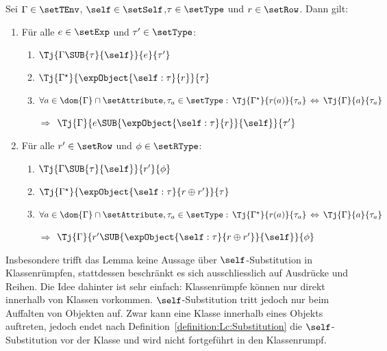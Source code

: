 \begin{lemma} \label{lemma:Lct:Typurteile_und_self_Substitution}
  Sei $\Gamma \in \setTEnv$, $\self\in\setSelf$,\linebreak[4] $\tau\in\setType$ und $r\in\setRow$. Dann gilt:
  \renewcommand{\labelenumii}{(\arabic{enumii})}
  \begin{enumerate}
    \item F\"ur alle $e\in\setExp$ und $\tau'\in\setType$:
          \begin{enumerate}
            \item $\Tj{\Gamma\SUB{\tau}{\self}}{e}{\tau'}$
            \item $\Tj{\Gamma^\star}{\expObject{\self:\tau}{r}}{\tau}$
            \item $\forall a\in\dom{\Gamma}\cap\setAttribute,\tau_a\in\setType:\,
                   \Tj{\Gamma^\star}{r(a)}{\tau_a}\,\Leftrightarrow\,\Tj{\Gamma}{a}{\tau_a}$
            \item[$\Rightarrow$] $\Tj{\Gamma}{e\SUB{\expObject{\self:\tau}{r}}{\self}}{\tau'}$
          \end{enumerate}

    \item F\"ur alle $r'\in\setRow$ und $\phi\in\setRType$:
          \begin{enumerate}
            \item $\Tj{\Gamma\SUB{\tau}{\self}}{r'}{\phi}$
            \item $\Tj{\Gamma^\star}{\expObject{\self:\tau}{r \oplus r'}}{\tau}$
            \item $\forall a\in\dom{\Gamma}\cap\setAttribute,\tau_a\in\setType:\,
                   \Tj{\Gamma^\star}{r(a)}{\tau_a}\,\Leftrightarrow\,\Tj{\Gamma}{a}{\tau_a}$
            \item[$\Rightarrow$] $\Tj{\Gamma}{r'\SUB{\expObject{\self:\tau}{r \oplus r'}}{\self}}{\phi}$
          \end{enumerate}
  \end{enumerate}
  \renewcommand{\labelenumii}{\arabic{enumii}.}
\end{lemma}

Insbesondere trifft das Lemma keine Aussage \"uber $\self$-Substitution in Klassenr\"umpfen, stattdessen
beschr\"ankt es sich ausschliesslich auf Ausdr\"ucke und Reihen. Die Idee dahinter ist sehr einfach:
Klassenr\"umpfe k\"onnen nur direkt innerhalb von Klassen vorkommen. $\self$-Substitution tritt jedoch
nur beim Auffalten von Objekten auf. Zwar kann eine Klasse innerhalb eines Objekts auftreten, jedoch
endet nach Definition~\ref{definition:Lc:Substitution} die $\self$-Substitution vor der
Klasse und wird nicht fortgef\"uhrt in den Klassenrumpf.

